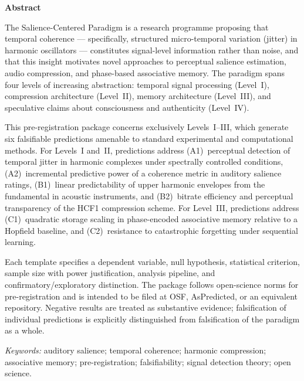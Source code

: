 \documentclass[11pt, a4paper]{article}
\newcommand{\hcf}{HCF1}
\newcommand{\scp}{Salience-Centered Paradigm}
\begin{document}
\thispagestyle{plain}
{\centering\large\bfseries\color{navy} Abstract\par}
\smallskip
\noindent
The \scp{} is a research programme proposing that temporal coherence — specifically,
structured micro-temporal variation (jitter) in harmonic oscillators — constitutes
signal-level information rather than noise, and that this insight motivates novel
approaches to perceptual salience estimation, audio compression, and phase-based
associative memory.  The paradigm spans four levels of increasing abstraction:
temporal signal processing (Level~I), compression architecture (Level~II),
memory architecture (Level~III), and speculative claims about consciousness and
authenticity (Level~IV).

This pre-registration package concerns exclusively Levels~I–III, which generate
six falsifiable predictions amenable to standard experimental and computational
methods.  For Levels~I and~II, predictions address (A1)~perceptual detection of
temporal jitter in harmonic complexes under spectrally controlled conditions,
(A2)~incremental predictive power of a coherence metric in auditory salience ratings,
(B1)~linear predictability of upper harmonic envelopes from the fundamental in
acoustic instruments, and (B2)~bitrate efficiency and perceptual transparency of
the \hcf{} compression scheme.  For Level~III, predictions address (C1)~quadratic
storage scaling in phase-encoded associative memory relative to a Hopfield baseline,
and (C2)~resistance to catastrophic forgetting under sequential learning.

Each template specifies a dependent variable, null hypothesis, statistical criterion,
sample size with power justification, analysis pipeline, and
confirmatory/exploratory distinction.  The package follows open-science norms for
pre-registration and is intended to be filed at OSF, AsPredicted, or an equivalent
repository.  Negative results are treated as substantive evidence; falsification of
individual predictions is explicitly distinguished from falsification of the paradigm
as a whole.

\noindent\textit{Keywords:} auditory salience; temporal coherence; harmonic compression;
associative memory; pre-registration; falsifiability; signal detection theory;
open science.

\newpage

\tableofcontents
\newpage
\end{document}
